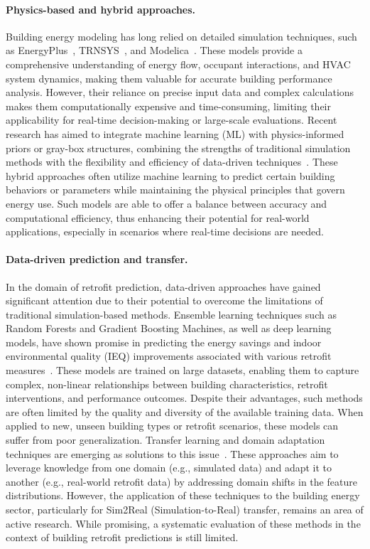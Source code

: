 ﻿\documentclass{article}
\begin{document}
\paragraph{Physics-based and hybrid approaches.} Building energy modeling has long relied on detailed simulation techniques, such as EnergyPlus~\citep{crawley2001energyplus}, TRNSYS~\citep{klein2017trnsys}, and Modelica~\citep{wang2015modelica}. These models provide a comprehensive understanding of energy flow, occupant interactions, and HVAC system dynamics, making them valuable for accurate building performance analysis. However, their reliance on precise input data and complex calculations makes them computationally expensive and time-consuming, limiting their applicability for real-time decision-making or large-scale evaluations. Recent research has aimed to integrate machine learning (ML) with physics-informed priors or gray-box structures, combining the strengths of traditional simulation methods with the flexibility and efficiency of data-driven techniques~\citep{drgona2020all,heinen2022flexibility}. These hybrid approaches often utilize machine learning to predict certain building behaviors or parameters while maintaining the physical principles that govern energy use. Such models are able to offer a balance between accuracy and computational efficiency, thus enhancing their potential for real-world applications, especially in scenarios where real-time decisions are needed.

\paragraph{Data-driven prediction and transfer.} In the domain of retrofit prediction, data-driven approaches have gained significant attention due to their potential to overcome the limitations of traditional simulation-based methods. Ensemble learning techniques such as Random Forests and Gradient Boosting Machines, as well as deep learning models, have shown promise in predicting the energy savings and indoor environmental quality (IEQ) improvements associated with various retrofit measures~\citep{ahmad2017review,li2021review,smarra2018data}. These models are trained on large datasets, enabling them to capture complex, non-linear relationships between building characteristics, retrofit interventions, and performance outcomes. Despite their advantages, such methods are often limited by the quality and diversity of the available training data. When applied to new, unseen building types or retrofit scenarios, these models can suffer from poor generalization. Transfer learning and domain adaptation techniques are emerging as solutions to this issue~\citep{hong2020transfer,mahnke2022transfer,li2022domain}. These approaches aim to leverage knowledge from one domain (e.g., simulated data) and adapt it to another (e.g., real-world retrofit data) by addressing domain shifts in the feature distributions. However, the application of these techniques to the building energy sector, particularly for Sim2Real (Simulation-to-Real) transfer, remains an area of active research. While promising, a systematic evaluation of these methods in the context of building retrofit predictions is still limited.
\end{document}
